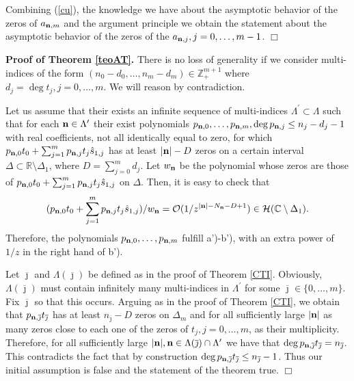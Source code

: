 \documentclass[10pt,a4paper]{article}
\theoremstyle{definition}
\theoremstyle{remark}
\numberwithin{equation}{section}
\begin{document}
Combining (\ref{cu}), the knowledge we have about the asymptotic behavior of the zeros of $a_{{\bf n},m}$ and the argument principle we obtain the statement about the  asymptotic behavior of the  zeros of the $a_{{\bf n},j}, j=0,\ldots,m-1$. \hfill $\Box$
\medskip





{\bf Proof of Theorem \ref{teoAT}.} There is no loss of generality if we consider multi-indices of the form
$(n_0 -d_0,\ldots,n_m-d_m)\in \mathbb{Z}_+^{m+1}$ where $d_j = \deg t_j, j=0,\ldots,m$. We will reason by contradiction.


Let us assume that their exists an infinite sequence of multi-indices $\Lambda^{\prime} \subset \Lambda$
such that for each ${\bf n} \in \Lambda^{\prime}$
their exist polynomials $p_{{\bf n},0},\ldots,p_{{\bf n},m},\deg p_{{\bf n},j} \leq n_j -d_j -1$
with real coefficients, not all identically equal to zero,  for which $ p_{{{\bf n}},0} t_0 +\sum_{j=1}^m p_{{{\bf n}},j}   t_j \hat{s}_{1,j}$  has at least $|{\bf n}|  - D$ zeros on a certain interval $\Delta \subset \mathbb{R}\setminus \Delta_{1}$, where $D = \sum_{j=0}^m d_j$. Let $w_{\bf n}$ be the polynomial whose zeros are those of $p_{{{\bf n}},0} t_0 +\sum_{j=1}^m p_{{{\bf n}},j}   t_j \hat{s}_{1,j}$ on $\Delta$. Then, it is easy to check that
\[ (p_{{{\bf n}},0} t_0 +\sum_{j=1}^m p_{{{\bf n}},j}   t_j \hat{s}_{1,j})/w_{\bf n} = {\mathcal{O}}(1/z^{|{{\bf n}}|- N_{\bf n}-D +1}) \in \mathcal{H}(\mathbb{C} \setminus \Delta_1).
\]
Therefore, the polynomials $p_{{\bf n},0}, \ldots, p_{{\bf n},m}$ fulfill a')-b'), with an extra power of $1/z$ in the right hand of b').

Let $\overline{\jmath}$ and $\Lambda(\overline{\jmath})$ be defined as in the proof of Theorem \ref{CTI}. Obviously,
$\Lambda(\overline{\jmath})$ must contain infinitely many multi-indices in $\Lambda^{\prime}$ for some
$\overline{\jmath} \in \{0,\ldots,m\}$. Fix
$\overline{\jmath}$ so that this occurs. Arguing as in the proof of Theorem  \ref{CTI}, we obtain that $p_{{\bf n},\overline{\jmath}}t_{\overline{\jmath}}$  has at least $n_{\overline{\jmath}} - D$ zeros on $\Delta_m$ and for all sufficiently large $|{\bf n}|$ as many zeros close to each one of the zeros  of $t_j, j=0,\ldots,m$, as their multiplicity. Therefore, for all sufficiently large $|{\bf n}|, {\bf n} \in \Lambda(\overline{\jmath}) \cap \Lambda^{\prime}$ we have that $\deg p_{{\bf n},\overline{\jmath}}t_{\overline{\jmath}} = n_{\overline{\jmath}}$. This contradicts the fact that by construction $\deg p_{{\bf n},\overline{\jmath}}t_{\overline{\jmath}} \leq n_{\overline{\jmath}}-1$. Thus our initial assumption is false and the statement of the theorem  true. \hfill $\Box$
\end{document}
